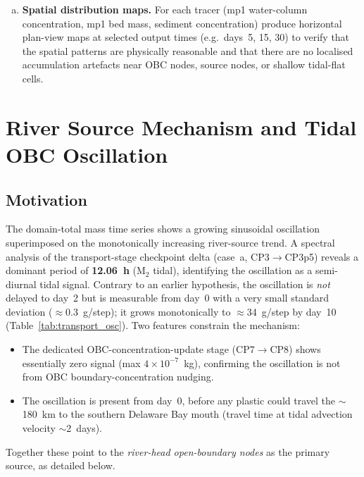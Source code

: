 \documentclass[11pt]{article}
\begin{document}
\begin{enumerate}
\begin{enumerate}[(a)]
  \item \textbf{Spatial distribution maps.}
        For each tracer (mp1 water-column concentration, mp1 bed mass,
        sediment concentration) produce horizontal plan-view maps at selected
        output times (e.g.\ days~5, 15, 30) to verify that the spatial
        patterns are physically reasonable and that there are no localised
        accumulation artefacts near OBC nodes, source nodes, or shallow
        tidal-flat cells.

\end{enumerate}

\end{enumerate}

\section*{River Source Mechanism and Tidal OBC Oscillation}

\subsection*{Motivation}

The domain-total mass time series shows a growing sinusoidal oscillation
superimposed on the monotonically increasing river-source trend.
A spectral analysis of the transport-stage checkpoint delta (case~a,
CP3$\to$CP3p5) reveals a dominant period of \textbf{12.06~h} (M$_2$ tidal),
identifying the oscillation as a semi-diurnal tidal signal.
Contrary to an earlier hypothesis, the oscillation is \emph{not} delayed
to day~2 but is measurable from day~0 with a very small standard deviation
($\approx$0.3~g/step); it grows monotonically to $\approx$34~g/step
by day~10 (Table~\ref{tab:transport_osc}).
Two features constrain the mechanism:
\begin{itemize}
  \item The dedicated OBC-concentration-update stage (CP7$\to$CP8) shows
        essentially zero signal (max $4\times10^{-7}$~kg), confirming
        the oscillation is not from OBC boundary-concentration nudging.
  \item The oscillation is present from day~0, before any plastic
        could travel the $\sim$180~km to the southern Delaware Bay mouth
        (travel time at tidal advection velocity $\sim$2~days).
\end{itemize}
Together these point to the \emph{river-head open-boundary nodes} as the
primary source, as detailed below.
\end{document}
